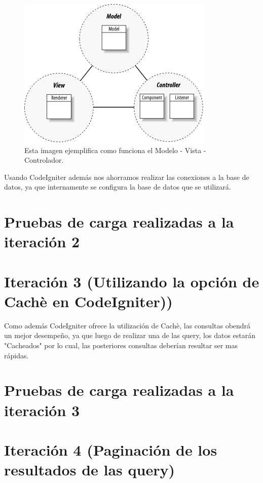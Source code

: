  \begin{figure}[htb]
 	\label{Figura9}
 	\begin{center}
 		\includegraphics[scale=0.5]{imagenes/mvc.JPG}
 		\caption{Esta imagen ejemplifica como funciona el Modelo - Vista - Controlador.}
 	\end{center}
 \end{figure}
 
 Usando CodeIgniter además nos ahorramos realizar las conexiones a la base de datos, ya que internamente se configura la base de datos que se utilizará. 
 
 \section{Pruebas de carga realizadas a la iteración 2}
 
 \section{Iteración 3 (Utilizando la opción de Cachè en CodeIgniter))}
 
 Como además CodeIgniter ofrece la utilización de Cachè, las consultas obendrá un mejor desempeño, ya que luego de realizar una de las query, los datos estarán "Cacheados" por lo cual, las posteriores consultas deberían resultar ser mas rápidas. 
 
 \section{Pruebas de carga realizadas a la iteración 3}
 
 \section{Iteración 4 (Paginación de los resultados de las query)}  

